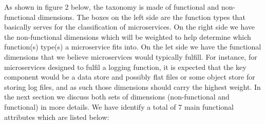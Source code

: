 \documentclass{article}
\begin{document}
As shown in figure 2 below, the taxonomy is made of functional and non-functional dimensions. The boxes on the left side are the function types that basically serves for the classification of microservices. On the right side we have the non-functional dimensions which will be weighted to help determine which function(s) type(s) a microservice fits into. On the let side we have the functional dimensions that we believe microservices would typically fulfill. For instance, for microservices designed to fulfil a logging function, it is expected that the key component would be a data store and possibly flat files or some object store for storing log files, and as such those dimensions should carry the highest weight. In the next section we discuss both sets of dimensions (non-functional and functional) in more details. We have identify a total of 7 main functional attributes which are listed below:
\end{document}
